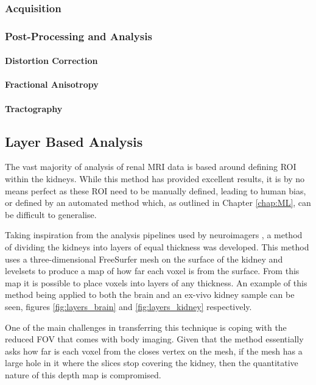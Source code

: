 \subsubsection{Acquisition}

\subsubsection{Post-Processing and Analysis}
\paragraph{Distortion Correction}
\paragraph{Fractional Anisotropy}
\paragraph{Tractography}

\subsection{Layer Based Analysis}

The vast majority of analysis of renal \ac{MRI} data is based around defining \ac{ROI} within the kidneys. While this method has provided excellent results, it is by no means perfect as these \ac{ROI} need to be manually defined, leading to human bias, or defined by an automated method which, as outlined in Chapter \ref{chap:ML}, can be difficult to generalise.

Taking inspiration from the analysis pipelines used by neuroimagers \cite{self_benchmarking_2019, muckli_contextual_2015, waehnert_anatomically_2014}, a method of dividing the kidneys into layers of equal thickness was developed. This method uses a three-dimensional FreeSurfer mesh on the surface of the kidney \cite{dale_cortical_1999} and levelsets to produce a map of how far each voxel is from the surface. From this map it is possible to place voxels into layers of any thickness. An example of this method being applied to both the brain and an ex-vivo kidney sample can be seen, figures \ref{fig:layers_brain} and \ref{fig:layers_kidney} respectively.

One of the main challenges in transferring this technique is coping with the reduced \ac{FOV} that comes with body imaging. Given that the method essentially asks how far is each voxel from the closes vertex on the mesh, if the mesh has a large hole in it where the slices stop covering the kidney, then the quantitative nature of this depth map is compromised.

